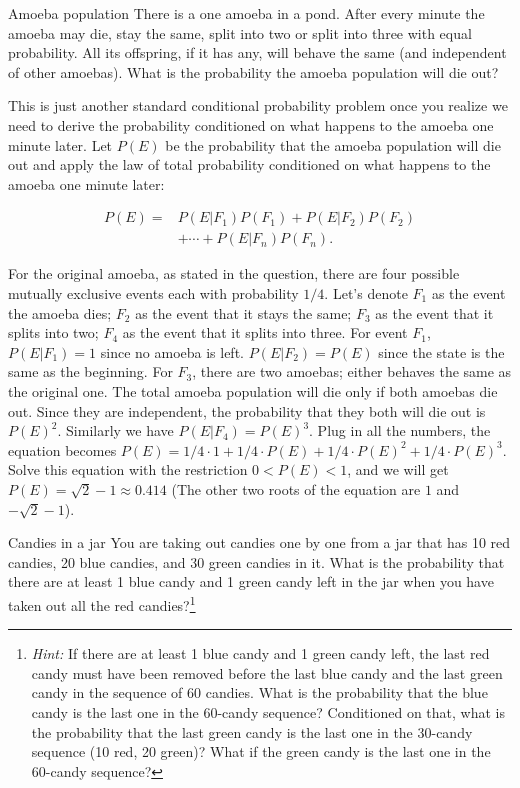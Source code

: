 
\begin{problem}{Amoeba population}
There is a one amoeba in a pond. After every minute the amoeba may die, stay the same,
split into two or split into three with equal probability. All its offspring, if it has any, will
behave the same (and independent of other amoebas). What is the probability the
amoeba population will die out?
\end{problem}

\begin{solution}
This is just another standard conditional probability problem once you realize
we need to derive the probability conditioned on what happens to the amoeba one
minute later. Let $P(E)$ be the probability that the amoeba population will die out and
apply the law of total probability conditioned on what happens to the amoeba one
minute later:

\[
\begin{aligned}
P(E)={}&P(E\vert F_1)P(F_1)+P(E\vert F_2)P(F_2)\\
&+\cdots+P(E\vert F_n)P(F_n).
\end{aligned}
\]

For the original amoeba, as stated in the question, there are four possible mutually
exclusive events each with probability $1/4$. Let's denote $F_1$ as the event the amoeba dies;
$F_2$ as the event that it stays the same; $F_3$ as the event that it splits into two; $F_4$ as the
event that it splits into three. For event $F_1$, $P(E\vert F_1)=1$ since no amoeba is left.
$P(E\vert F_2)=P(E)$ since the state is the same as the beginning. For $F_3$, there are two
amoebas; either behaves the same as the original one. The total amoeba population will
die only if both amoebas die out. Since they are independent, the probability that they
both will die out is $P(E)^2$. Similarly we have $P(E\vert F_4)=P(E)^3$. Plug in all the numbers,
the equation becomes $P(E)=1/4\cdot1+1/4\cdot P(E)+1/4\cdot P(E)^2+1/4\cdot P(E)^3$.
Solve this equation with the restriction $0<P(E)<1$, and we will get $P(E)=\sqrt{2}-1\approx0.414$
(The other two roots of the equation are $1$ and $-\sqrt{2}-1$).

\end{solution}

\begin{problem}{Candies in a jar}
You are taking out candies one by one from a jar that has 10 red candies, 20 blue candies,
and 30 green candies in it. What is the probability that there are at least 1 blue candy and
1 green candy left in the jar when you have taken out all the red candies?\footnote[16]{\emph{Hint:} If there are at least 1 blue candy and 1 green candy left, the last red candy must have been
removed before the last blue candy and the last green candy in the sequence of 60 candies. What is the
probability that the blue candy is the last one in the 60-candy sequence? Conditioned on that, what is the
probability that the last green candy is the last one in the 30-candy sequence (10 red, 20 green)? What if
the green candy is the last one in the 60-candy sequence?}
\end{problem}

